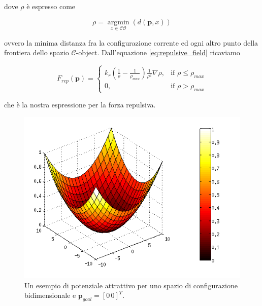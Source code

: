 \documentclass[a4paper,10pt]{article}
\begin{document}
dove $\rho$ è espresso come

\begin{equation}
\rho = \underset{x \in \mathcal{CO}}{\operatorname{argmin}}(d(\mathbf{p},x))
\end{equation}

\noindent ovvero la minima distanza fra la configurazione corrente ed ogni altro punto della frontiera dello spazio $\mathcal{C}$-object. Dall'equazione \ref{eq:repulsive_field} ricaviamo

\begin{equation}
F_{rep}(\mathbf{p}) = 
\begin{cases}
 k_r  \left( \frac{1}{\rho} - \frac{1}{\rho_{max}} \right) \frac{1}{\rho^2} \nabla \rho ,& \mbox{if } \rho \le \rho_{max} \\
 0 ,& \mbox{if } \rho > \rho_{max}
\end{cases}
\label{eq:repulsive_force}
\end{equation}

\noindent che è la nostra espressione per la forza repulsiva.

\begin{figure}
\begin{center}
\includegraphics[scale=0.5]{img/attractive.png}
\caption{Un esempio di potenziale attrattivo per uno spazio di configurazione bidimensionale e $\mathbf{p}_{goal} = [0 \, 0]^T$. }
\end{center}
\end{figure}
\end{document}
